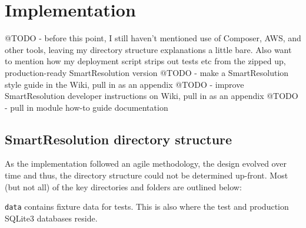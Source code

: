 \chapter{Implementation} %

@TODO - before this point, I still haven't mentioned use of Composer, AWS, and other tools, leaving my directory structure explanations a little bare. Also want to mention how my deployment script strips out tests etc from the zipped up, production-ready SmartResolution version
@TODO - make a SmartResolution style guide in the Wiki, pull in as an appendix
@TODO - improve SmartResolution developer instructions on Wiki, pull in as an appendix
@TODO - pull in module how-to guide documentation

\section{SmartResolution directory structure}

As the implementation followed an agile methodology, the design evolved over time and thus, the directory structure could not be determined up-front. Most (but not all) of the key directories and folders are outlined below:

\begin{minipage}{\textwidth}
\end{minipage}

\lstinline{data} contains fixture data for tests. This is also where the test and production SQLite3 databases reside.

